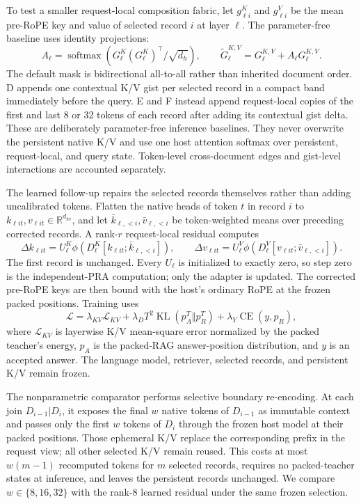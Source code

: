 \documentclass[11pt]{article}
\begin{document}
To test a smaller request-local composition fabric, let $g_{\ell i}^K$ and
$g_{\ell i}^V$ be the mean pre-RoPE key and value of selected record $i$ at
layer $\ell$. The parameter-free baseline uses identity projections:
\[
A_\ell=\operatorname{softmax}\!\left(
G_\ell^K(G_\ell^K)^\top/\sqrt{d_h}\right),\qquad
\widetilde G_\ell^{K,V}=G_\ell^{K,V}+A_\ell G_\ell^{K,V}.
\]
The default mask is bidirectional all-to-all rather than inherited document
order. D appends one contextual K/V gist per selected record in a compact band
immediately before the query. E and F instead append request-local copies of
the first and last 8 or 32 tokens of each record after adding its contextual
gist delta. These are deliberately parameter-free inference baselines. They
never overwrite the persistent native K/V and use one host attention softmax
over persistent, request-local, and query state. Token-level cross-document
edges and gist-level interactions are accounted separately.

The learned follow-up repairs the selected records themselves rather than
adding uncalibrated tokens. Flatten the native heads of token $t$ in record
$i$ to $k_{\ell it},v_{\ell it}\in\mathbb{R}^{d_{kv}}$, and let
$\bar{k}_{\ell,<i},\bar{v}_{\ell,<i}$ be token-weighted means over preceding
corrected records. A rank-$r$ request-local residual computes
\[
 \Delta k_{\ell it}=U^K_\ell\phi\!\left(
 D^K_\ell[k_{\ell it};\bar{k}_{\ell,<i}]\right),\qquad
 \Delta v_{\ell it}=U^V_\ell\phi\!\left(
 D^V_\ell[v_{\ell it};\bar{v}_{\ell,<i}]\right).
\]
The first record is unchanged. Every $U_\ell$ is initialized to exactly zero,
so step zero is the independent-PRA computation; only the adapter is updated.
The corrected pre-RoPE keys are then bound with the host's ordinary RoPE at the
frozen packed positions. Training uses
\[
 \mathcal L = \lambda_{KV}\mathcal L_{KV}
 +\lambda_D T^2\operatorname{KL}(p_A^T\Vert p_R^T)
 +\lambda_Y\operatorname{CE}(y,p_R),
\]
where $\mathcal L_{KV}$ is layerwise K/V mean-square error normalized by the
packed teacher's energy, $p_A$ is the packed-RAG answer-position distribution,
and $y$ is an accepted answer. The language model, retriever, selected records,
and persistent K/V remain frozen.

The nonparametric comparator performs selective boundary re-encoding. At each
join $D_{i-1}|D_i$, it exposes the final $w$ native tokens of $D_{i-1}$ as
immutable context and passes only the first $w$ tokens of $D_i$ through the
frozen host model at their packed positions. Those ephemeral K/V replace the
corresponding prefix in the request view; all other selected K/V remain reused.
This costs at most $w(m-1)$ recomputed tokens for $m$ selected records, requires
no packed-teacher states at inference, and leaves the persistent records
unchanged. We compare $w\in\{8,16,32\}$ with the rank-8 learned residual under
the same frozen selection.
\end{document}

